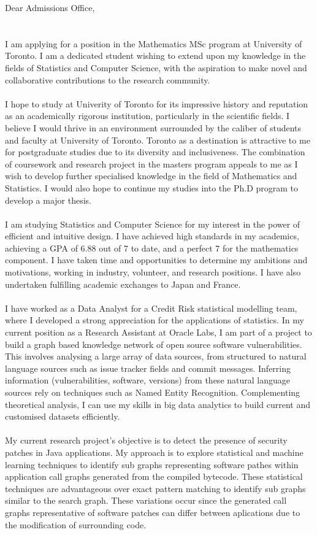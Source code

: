Dear Admissions Office,\\
\\
\\
I am applying for a position in the Mathematics MSc program at University of Toronto. I am a dedicated student wishing to extend upon my knowledge in the fields of Statistics and Computer Science, with the aspiration to make novel and collaborative contributions to the research community.\\
\\
I hope to study at Univerity of Toronto for its impressive history and reputation as an academically rigorous institution, particularly in the scientific fields. I believe I would thrive in an environment surrounded by the caliber of students and faculty at University of Toronto. Toronto as a destination is attractive to me for postgraduate studies due to its diversity and inclusiveness. The combination of coursework and research project in the masters program appeals to me as I wish to develop further specialised knowledge in the field of Mathematics and Statistics. I would also hope to continue my studies into the Ph.D program to develop a major thesis.\\
\\
I am studying Statistics and Computer Science for my interest in the power of efficient and intuitive design. I have achieved high standards in my academics, achieving a GPA of 6.88 out of 7 to date, and a perfect 7 for the mathematics component. I have taken time and opportunities to determine my ambitions and motivations, working in industry, volunteer, and research positions. I have also undertaken fulfilling academic exchanges to Japan and France.\\
\\
I have worked as a Data Analyst for a Credit Risk statistical modelling team, where I developed a strong appreciation for the applications of statistics. In my current position as a Research Assistant at Oracle Labs, I am part of a project to build a graph based knowledge network of open source software vulnerabilities. This involves analysing a large array of data sources, from structured to natural language sources such as issue tracker fields and commit messages. Inferring information (vulnerabilities, software, versions) from these natural language sources rely on techniques such as Named Entity Recognition. Complementing theoretical analysis, I can use my skills in big data analytics to build current and customised datasets efficiently.\\
\\
My current research project's objective is to detect the presence of security patches in Java applications. My approach is to explore statistical and machine learning techniques to identify sub graphs representing software pathes within application call graphs generated from the compiled bytecode. These statistical techniques are advantageous over exact pattern matching to identify sub graphs similar to the search graph. These variations occur since the generated call graphs representative of software patches can differ between aplications due to the modification of surrounding code.\\
\\
